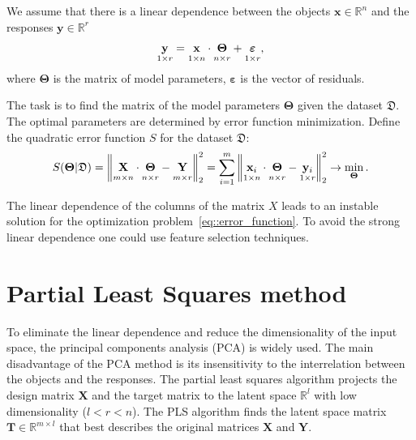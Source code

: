 \documentclass[12pt,twoside]{article}
\newcommand{\bx}{\mathbf{x}}
\newcommand{\by}{\mathbf{y}}
\newcommand{\bY}{\mathbf{Y}}
\newcommand{\bX}{\mathbf{X}}
\newcommand{\bT}{\mathbf{T}}
\newcommand{\bTheta}{\boldsymbol{\Theta}}
\begin{document}
We assume that there is a linear dependence between the objects $\bx \in \mathbb{R}^n$ and the responses $\by \in \mathbb{R}^r$
\begin{equation}
 \underset{1 \times r}{\by} = \underset{1 \times n}{\vphantom{\by}\bx} \cdot \underset{n \times r}{\vphantom{\by}\bTheta} + \underset{1 \times r}{\vphantom{\by}\boldsymbol{\varepsilon}}, 
\label{eq::model}
\end{equation}
where $\bTheta$ is the matrix of model parameters, $\boldsymbol{\varepsilon}$ is the vector of residuals.

The task is to find the matrix of the model parameters $\bTheta$ given the dataset $\mathfrak{D}$.
The optimal parameters are determined by error function minimization. 
Define the quadratic error function $S$ for the dataset $\mathfrak{D}$:
\begin{equation}
	S(\bTheta | \mathfrak{D}) = {\left\| \underset{m \times n}{\vphantom{\by}\mathbf{X}} \cdot \underset{n \times r}{\vphantom{\by}\bTheta} - \underset{m \times r}{\vphantom{\by}\mathbf{Y}} \right\| }_2^2 = \sum_{i=1}^m \left\| \underset{1 \times n}{\vphantom{\by}\bx_i} \cdot \underset{n \times r}{\vphantom{\by}\bTheta} - \underset{1 \times r}{\vphantom{\by}\by_i} \right\|_2^2 \rightarrow\min_{\bTheta}.
\label{eq::error_function}
\end{equation}
 
 The linear dependence of the columns of the matrix $X$ leads to an instable solution for the optimization problem~\eqref{eq::error_function}. 
 To avoid the strong linear dependence one could use feature selection techniques.

\section{Partial Least Squares method}

To eliminate the linear dependence and reduce the dimensionality of the input space, the principal components analysis (PCA) is widely used. 
The main disadvantage of the PCA method is its insensitivity to the interrelation between the objects and the responses.
The partial least squares algorithm projects the design matrix $\bX$ and the target matrix to the latent space $\mathbb{R}^l$ with low dimensionality ($l < r < n$).
The PLS algorithm finds the latent space matrix $\bT \in \mathbb{R}^{m \times l}$ that best describes the original matrices $\bX$ and $\bY$.
\end{document}
